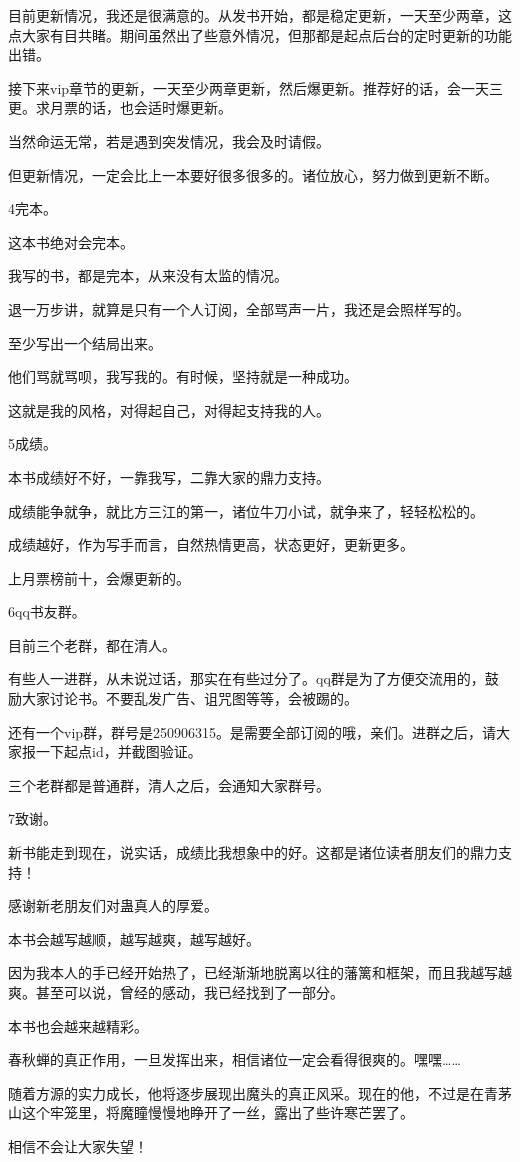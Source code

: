 \begin{this_body}
目前更新情况，我还是很满意的。从发书开始，都是稳定更新，一天至少两章，这点大家有目共睹。期间虽然出了些意外情况，但那都是起点后台的定时更新的功能出错。

接下来vip章节的更新，一天至少两章更新，然后爆更新。推荐好的话，会一天三更。求月票的话，也会适时爆更新。

当然命运无常，若是遇到突发情况，我会及时请假。

但更新情况，一定会比上一本要好很多很多的。诸位放心，努力做到更新不断。

4完本。

这本书绝对会完本。

我写的书，都是完本，从来没有太监的情况。

退一万步讲，就算是只有一个人订阅，全部骂声一片，我还是会照样写的。

至少写出一个结局出来。

他们骂就骂呗，我写我的。有时候，坚持就是一种成功。

这就是我的风格，对得起自己，对得起支持我的人。

5成绩。

本书成绩好不好，一靠我写，二靠大家的鼎力支持。

成绩能争就争，就比方三江的第一，诸位牛刀小试，就争来了，轻轻松松的。

成绩越好，作为写手而言，自然热情更高，状态更好，更新更多。

上月票榜前十，会爆更新的。

6qq书友群。

目前三个老群，都在清人。

有些人一进群，从未说过话，那实在有些过分了。qq群是为了方便交流用的，鼓励大家讨论书。不要乱发广告、诅咒图等等，会被踢的。

还有一个vip群，群号是250906315。是需要全部订阅的哦，亲们。进群之后，请大家报一下起点id，并截图验证。

三个老群都是普通群，清人之后，会通知大家群号。

7致谢。

新书能走到现在，说实话，成绩比我想象中的好。这都是诸位读者朋友们的鼎力支持！

感谢新老朋友们对蛊真人的厚爱。

本书会越写越顺，越写越爽，越写越好。

因为我本人的手已经开始热了，已经渐渐地脱离以往的藩篱和框架，而且我越写越爽。甚至可以说，曾经的感动，我已经找到了一部分。

本书也会越来越精彩。

春秋蝉的真正作用，一旦发挥出来，相信诸位一定会看得很爽的。嘿嘿……

随着方源的实力成长，他将逐步展现出魔头的真正风采。现在的他，不过是在青茅山这个牢笼里，将魔瞳慢慢地睁开了一丝，露出了些许寒芒罢了。

相信不会让大家失望！

\end{this_body}

